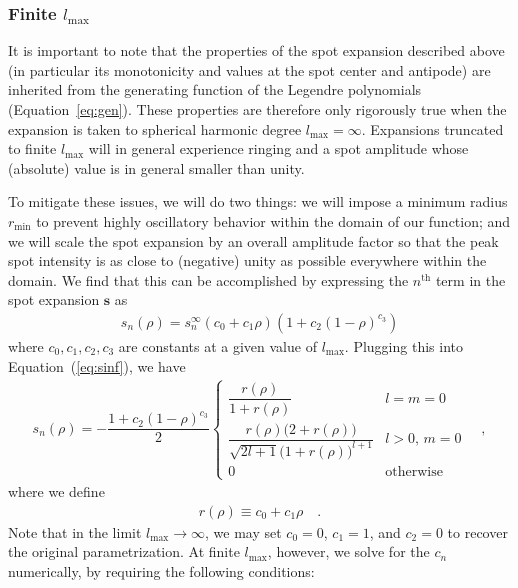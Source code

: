 \documentclass[modern]{aastex62}
\begin{document}
\subsubsection{Finite $l_{\mathrm{max}}$}
%
It is important to note that the
properties of the spot expansion described above
(in particular its monotonicity and values at the spot center and antipode)
are inherited from the generating function of the Legendre polynomials
(Equation~\ref{eq:gen}). These properties are therefore only rigorously
true when the expansion is taken to spherical
harmonic degree $l_{\mathrm{max}} = \infty$. Expansions truncated to finite
$l_{\mathrm{max}}$ will in general experience ringing and a spot amplitude
whose (absolute) value is in general smaller than unity.

To mitigate these issues, we will do two things: we will impose a minimum
radius $r_{\mathrm{min}}$ to prevent highly oscillatory behavior within
the domain of our function; and we will scale the spot expansion
by an overall amplitude factor so that
the peak spot intensity is as close to (negative) unity as possible
everywhere within the domain.
We find that this can be accomplished by expressing the
$n^{\mathrm{th}}$ term in the spot expansion $\mathbf{s}$ as
%
\begin{align}
    s_n(\rho) = s_n^\infty\left( c_0 + c_1\rho \right) \left(1 + c_2 \left(1 - \rho\right) ^ {c_3}\right)
\end{align}
%
where $c_0, c_1, c_2, c_3$ are constants at a given
value of $l_{\mathrm{max}}$.
%
Plugging this into Equation~(\ref{eq:sinf}), we have
%
\begin{align}
    \label{eq:s}
    s_{n}(\rho) =
    -\dfrac{1 + c_2 \left(1 - \rho\right) ^ {c_3}}{2}
    \begin{cases}
        \dfrac{r\left(\rho\right)}{1 + r\left(\rho\right)}
         & l = m = 0
        \\[1em]
        \dfrac{ r\left(\rho\right) \big( 2 + r\left(\rho\right) \big)}
        {\sqrt{2l + 1} \big(1 + r\left(\rho\right)\big)^{l + 1}}
         & l > 0, \, m = 0
        \\[1em]
        0
         & \mathrm{otherwise}
    \end{cases}
    \quad,
\end{align}
%
where we define
%
\begin{align}
    r\left(\rho\right) \equiv c_0 + c_1\rho
    \quad.
\end{align}
%
Note that in the limit $l_{\mathrm{max}} \rightarrow \infty$, we may set
$c_0 = 0$, $c_1 = 1$, and $c_2 = 0$ to recover the original parametrization.
At finite $l_{\mathrm{max}}$, however, we solve for the $c_n$ numerically,
by requiring the following conditions:
\end{document}
